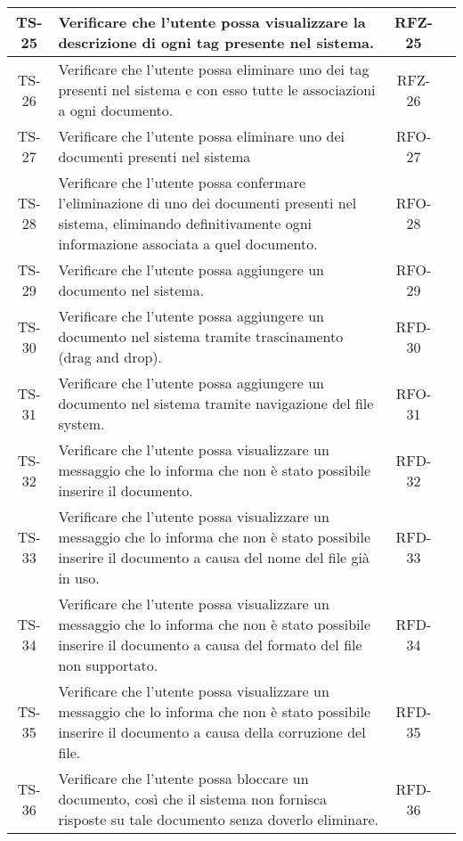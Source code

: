 \begin{xltabular}{\textwidth}{| c | X | c | c |}
    \hline
    TS-25 & Verificare che l’utente possa visualizzare la descrizione di ogni tag presente nel sistema. & RFZ-25 & \textcolor{xmarkcolor}{} \\
    \hline
    TS-26 & Verificare che l’utente possa eliminare uno dei tag presenti nel sistema e con esso tutte le associazioni a ogni documento. & RFZ-26 & \textcolor{xmarkcolor}{} \\
    \hline
    TS-27 & Verificare che l’utente possa eliminare uno dei documenti presenti nel sistema & RFO-27 & \textcolor{cmarkcolor}{} \\
    \hline
    TS-28 & Verificare che l’utente possa confermare l’eliminazione di uno dei documenti presenti nel sistema, eliminando definitivamente  ogni informazione associata a quel documento. & RFO-28 & \textcolor{cmarkcolor}{} \\
    \hline
    TS-29 & Verificare che l’utente possa aggiungere un documento nel sistema. & RFO-29 & \textcolor{cmarkcolor}{} \\
    \hline
    TS-30 & Verificare che l’utente possa aggiungere un documento nel sistema tramite trascinamento (drag and drop). & RFD-30 & \textcolor{cmarkcolor}{} \\
    \hline
    TS-31 & Verificare che l’utente possa aggiungere un documento nel sistema tramite navigazione del file system. & RFO-31 & \textcolor{cmarkcolor}{} \\
    \hline
    TS-32 & Verificare che l'utente possa visualizzare un messaggio che lo informa che non è stato possibile inserire il documento. & RFD-32 & \textcolor{cmarkcolor}{} \\
    \hline
    TS-33 & Verificare che l'utente possa visualizzare un messaggio che lo informa che non è stato possibile inserire il documento a causa del nome del file già in uso. & RFD-33 & \textcolor{xmarkcolor}{} \\
    \hline
    TS-34 & Verificare che l’utente possa visualizzare un messaggio che lo informa che non è stato possibile inserire il documento a causa del formato del file non supportato. & RFD-34 & \textcolor{cmarkcolor}{} \\
    \hline
    TS-35 & Verificare che l’utente possa visualizzare un messaggio che lo informa che non è stato possibile inserire il documento a causa della corruzione del file. & RFD-35 & \textcolor{xmarkcolor}{} \\
    \hline
    TS-36 & Verificare che l'utente possa bloccare un documento, così che il sistema non fornisca risposte su tale documento senza doverlo eliminare. & RFD-36 & \textcolor{cmarkcolor}{} \\

\end{xltabular}
